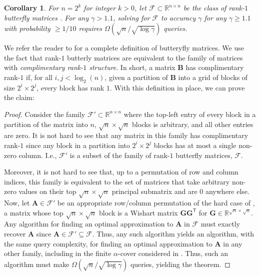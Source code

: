 \documentclass{article}[11pt]
\newtheorem{corollary}{Corollary}
\theoremstyle{definition}
\newcommand{\bv}[1]{\boldsymbol{\mathbf{#1}}}
\newcommand{\R}{\mathbb{R}}
\newcommand{\T}{\mathsf{T}}
\newcommand{\F}{\mathcal{F}}
\begin{document}
\begin{corollary}\label{cor:butterfly}
    For $n = 2^k$ for integer $k > 0$, let $\mathcal{F}\subset \R^{n \times n}$ be the class of rank-$1$ butterfly matrices \cite{LiYangMartin:2015}. For any $\gamma > 1.1$, solving   for $\F$ to accuracy $\gamma$ for any $\gamma \ge 1.1$ with probability $\ge 1/10$ requires $\Omega(\sqrt{n}/\sqrt{\log \gamma})$ queries.
\end{corollary}
We refer the reader to \cite{LiYang:2017} for a complete definition of butteryfly matrices. We use the fact that rank-$1$ butterly matrices are equivalent to the family of matrices with \emph{complimentary rank-$1$ structure}. In short, a matrix $\bv{B}$ has complimentary rank-$1$ if, for all $i,j < \log_2(n)$, given a partition of $\bv{B}$ into a grid of blocks of size $2^i\times 2^j$, every block has rank $1$. With this definition in place, we can prove the claim:
\begin{proof}
    Consider the family $\mathcal{F'} \subset \R^{n \times n}$ where the top-left entry of every block in a partition of the matrix into $n$, $\sqrt{n} \times \sqrt{n}$ blocks is arbitrary, and all other entries are zero. It is not hard to see that any matrix in this family has complimentary rank-$1$ since any block in a partition into $2^i\times 2^j$ blocks has at most a single non-zero column.  I.e., $\F'$ is a subset of the family of rank-$1$ butterfly matrices, $\mathcal F$.

    Moreover, it is not hard to see that, up to a permutation of row and column indices, this family is equivalent to the set of matrices that take arbitrary non-zero values on their top $\sqrt{n} \times \sqrt{n}$ principal submatrix and are $0$ anywhere else. Now, let $\bv A \in \F'$ be an appropriate row/column permutation of the hard case of , a matrix  whose top $\sqrt{n} \times \sqrt{n}$ block is a Wishart matrix $\bv G \bv G^\T$ for $\bv G \in \R^{\sqrt n \times \sqrt{n}}$. Any algorithm for finding an optimal approximation to $\bv A$ in $\F$ must exactly recover $\bv A$ since $\bv A \in \mathcal F' \subseteq \F$. Thus, any such algorithm yields an algorithm, with the same query complexity, for finding an optimal approximation to $\bv A$ in any other family, including in the finite $\alpha$-cover considered in . Thus, such an algorithm must make $\Omega(\sqrt{n}/\sqrt{\log \gamma})$ queries, yielding the theorem.
\end{proof}
\end{document}
